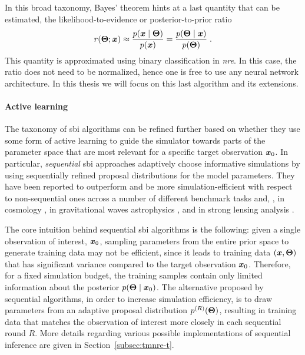 In this broad taxonomy, Bayes' theorem hints at a last quantity that can be estimated, the likelihood-to-evidence or posterior-to-prior ratio 
\begin{equation}
	r(\bm{\Theta};\bm{x})\approx\frac{p(\bm{x}\mid\bm{\Theta})}{p(\bm{x})}=\frac{p(\bm{\Theta}\mid\bm{x})}{p(\bm{\Theta})}\; .
\end{equation}
This quantity is approximated using binary classification in \emph{\gls*{nre}}.
In this case, the ratio does not need to be normalized, hence one is free to use any neural network architecture. %
In this thesis we will focus on this last algorithm and its extensions.

\paragraph*{Active learning} The taxonomy of \gls*{sbi} algorithms can be refined further based on whether they use some form of {active learning} to guide the simulator towards parts of the parameter space that are most relevant for a specific target observation $\bm{x}_0$. In particular, \emph{sequential} \gls*{sbi} approaches adaptively choose informative simulations by using sequentially refined proposal distributions for the model parameters. They have been reported to outperform and be more simulation-efficient with respect to non-sequential ones across a number of different benchmark tasks \citep{Lueckmann:2021aa} and, \eg, in cosmology \cite{Cole:2021gwr}, in gravitational waves astrophysics \cite{Bhardwaj:2023xph}, and in strong lensing analysis \cite{wagnercarena2024strong}. 

The core intuition behind sequential \gls*{sbi} algorithms is the following: given a single observation of interest, $\bm{x}_0$, sampling parameters from the entire prior space to generate training data may not be efficient, since it leads to training data $(\bm{x}, \bm{\Theta})$ that has significant variance compared to the target observation $\bm{x}_0$. Therefore, for a fixed simulation budget, the training samples contain only limited information about the posterior $p(\bm{\Theta}\mid\bm{x}_0)$. The alternative proposed by sequential algorithms, in order to increase simulation efficiency, is to draw parameters from an adaptive proposal distribution $p^{(R)}(\bm{\Theta})$, resulting in training data that matches the observation of interest more closely in each sequential round $R$. More details regarding various possible implementations of sequential inference are given in Section~\ref{subsec:tmnre-t}.


